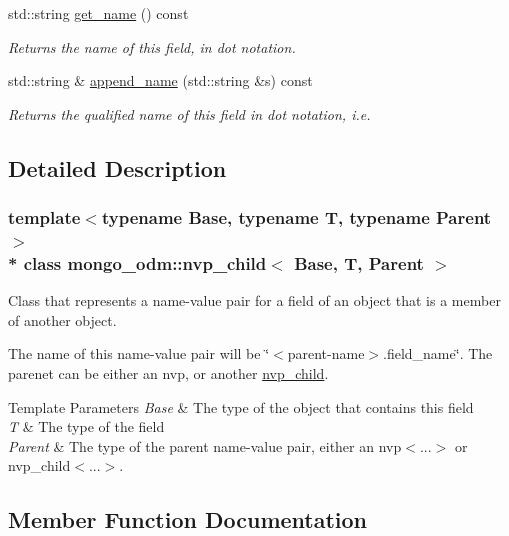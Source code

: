 \begin{DoxyCompactItemize}
std\+::string \hyperlink{classmongo__odm_1_1nvp__child_a826c7a25afba46a514cca886ade9d684}{get\+\_\+name} () const 
\begin{DoxyCompactList}\small\item\em Returns the name of this field, in dot notation. \end{DoxyCompactList}\item 
std\+::string \& \hyperlink{classmongo__odm_1_1nvp__child_a17cb684c6f0793862f1a44ef616c0b0f}{append\+\_\+name} (std\+::string \&s) const 
\begin{DoxyCompactList}\small\item\em Returns the qualified name of this field in dot notation, i.\+e. \end{DoxyCompactList}\end{DoxyCompactItemize}


\subsection{Detailed Description}
\subsubsection*{template$<$typename Base, typename T, typename Parent$>$\\*
class mongo\+\_\+odm\+::nvp\+\_\+child$<$ Base, T, Parent $>$}

Class that represents a name-\/value pair for a field of an object that is a member of another object. 

The name of this name-\/value pair will be \char`\"{}$<$parent-\/name$>$.\+field\+\_\+name\char`\"{}. The parenet can be either an nvp, or another \hyperlink{classmongo__odm_1_1nvp__child}{nvp\+\_\+child}. 
\begin{DoxyTemplParams}{Template Parameters}
{\em Base} & The type of the object that contains this field \\
\hline
{\em T} & The type of the field \\
\hline
{\em Parent} & The type of the parent name-\/value pair, either an nvp$<$...$>$ or nvp\+\_\+child$<$...$>$. \\
\hline
\end{DoxyTemplParams}


\subsection{Member Function Documentation}
